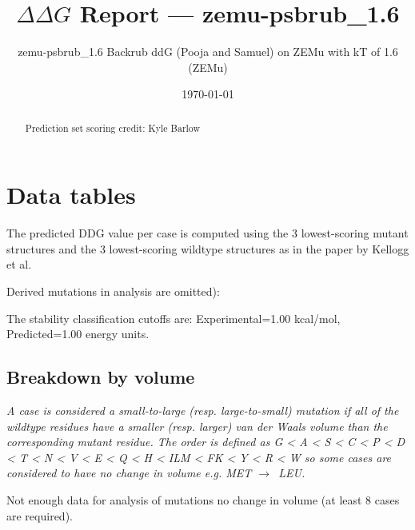 \documentclass[10pt, letterpaper, oneside, titlepage, landscape]{scrreprt}
\title{$\Delta\Delta G$ Report --- zemu-psbrub\_1.6}
\subtitle{zemu-psbrub\_1.6 Backrub ddG (Pooja and Samuel) on ZEMu with kT of 1.6 (ZEMu)}
\date{\today}
\begin{document}
\maketitle
\tableofcontents

\clearpage

\begin{abstract}
Prediction set scoring credit: Kyle Barlow

\end{abstract}


\clearpage

\section{Data tables}

The predicted DDG value per case is computed using the 3 lowest-scoring mutant structures and the 3 lowest-scoring wildtype structures as in the paper by Kellogg et al.

Derived mutations in analysis are omitted):

The stability classification cutoffs are: Experimental=1.00 kcal/mol, Predicted=1.00 energy units.
\subsection{Breakdown by volume}
\textit{A case is considered a small-to-large (resp. large-to-small) mutation if all of the wildtype residues have a smaller (resp. larger) van der Waals volume than the corresponding mutant residue. The order is defined as G < A < S < C < P < D < T < N < V < E < Q < H < ILM < FK < Y < R < W so some cases are considered to have no change in volume e.g. MET $\rightarrow$\ LEU.}

Not enough data for analysis of mutations no change in volume (at least 8 cases are required).
\end{document}
